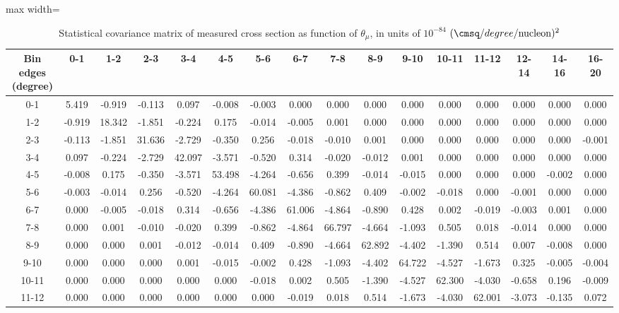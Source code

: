 \documentclass[11pt]{article}
\begin{document}
\begin{table}
  \centering
  \renewcommand{\arraystretch}{1.15}
  \caption{Statistical covariance matrix of measured cross section as function of $\theta_{\mu}$, in units of $10^{-84}$ $(\cmsq/degree/\mathrm{nucleon})^2$}
  \begin{adjustbox}{max width=\textwidth}
    \begin{tabular}{c||ccccccccccccccc}
      Bin edges (degree) & 0-1 & 1-2 & 2-3 & 3-4 & 4-5 & 5-6 & 6-7 & 7-8 & 8-9 & 9-10 & 10-11 & 11-12 & 12-14 & 14-16 & 16-20\\
      \hline
      \hline
      0-1 & 5.419 & -0.919 & -0.113 & 0.097 & -0.008 & -0.003 & 0.000 & 0.000 & 0.000 & 0.000 & 0.000 & 0.000 & 0.000 & 0.000 & 0.000\\
      1-2 & -0.919 & 18.342 & -1.851 & -0.224 & 0.175 & -0.014 & -0.005 & 0.001 & 0.000 & 0.000 & 0.000 & 0.000 & 0.000 & 0.000 & 0.000\\
      2-3 & -0.113 & -1.851 & 31.636 & -2.729 & -0.350 & 0.256 & -0.018 & -0.010 & 0.001 & 0.000 & 0.000 & 0.000 & 0.000 & 0.000 & -0.001\\
      3-4 & 0.097 & -0.224 & -2.729 & 42.097 & -3.571 & -0.520 & 0.314 & -0.020 & -0.012 & 0.001 & 0.000 & 0.000 & 0.000 & 0.000 & 0.000\\
      4-5 & -0.008 & 0.175 & -0.350 & -3.571 & 53.498 & -4.264 & -0.656 & 0.399 & -0.014 & -0.015 & 0.000 & 0.000 & 0.000 & -0.002 & 0.000\\
      5-6 & -0.003 & -0.014 & 0.256 & -0.520 & -4.264 & 60.081 & -4.386 & -0.862 & 0.409 & -0.002 & -0.018 & 0.000 & -0.001 & 0.000 & 0.000\\
      6-7 & 0.000 & -0.005 & -0.018 & 0.314 & -0.656 & -4.386 & 61.006 & -4.864 & -0.890 & 0.428 & 0.002 & -0.019 & -0.003 & 0.001 & 0.000\\
      7-8 & 0.000 & 0.001 & -0.010 & -0.020 & 0.399 & -0.862 & -4.864 & 66.797 & -4.664 & -1.093 & 0.505 & 0.018 & -0.014 & 0.000 & 0.000\\
      8-9 & 0.000 & 0.000 & 0.001 & -0.012 & -0.014 & 0.409 & -0.890 & -4.664 & 62.892 & -4.402 & -1.390 & 0.514 & 0.007 & -0.008 & 0.000\\
      9-10 & 0.000 & 0.000 & 0.000 & 0.001 & -0.015 & -0.002 & 0.428 & -1.093 & -4.402 & 64.722 & -4.527 & -1.673 & 0.325 & -0.005 & -0.004\\
      10-11 & 0.000 & 0.000 & 0.000 & 0.000 & 0.000 & -0.018 & 0.002 & 0.505 & -1.390 & -4.527 & 62.300 & -4.030 & -0.658 & 0.196 & -0.009\\
      11-12 & 0.000 & 0.000 & 0.000 & 0.000 & 0.000 & 0.000 & -0.019 & 0.018 & 0.514 & -1.673 & -4.030 & 62.001 & -3.073 & -0.135 & 0.072\\

\end{tabular}
\end{adjustbox}
\end{table}
\end{document}
